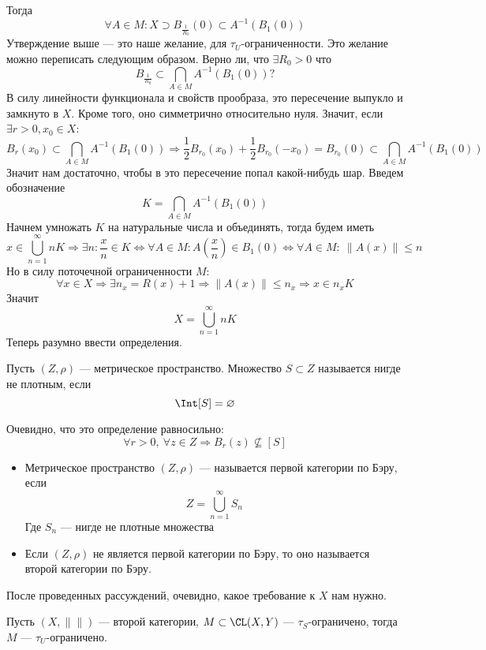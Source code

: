 Тогда 
$$
\forall A \in M: X \supset B_{\frac{1}{R_0}}(0) \subset A^{-1}(B_1(0))
$$
Утверждение выше --- это наше желание, для $\tau_U$-ограниченности. Это желание можно переписать следующим образом. Верно ли, что $\exists R_0 > 0$ что
$$
B_{\frac{1}{R_0}} \subset \bigcap_{A \in M}A^{-1}(B_1(0))?
$$
В силу линейности функционала и свойств прообраза, это пересечение выпукло и замкнуто в $X$. Кроме того, оно симметрично относительно нуля. Значит, если $\exists r > 0, x_0 \in X$:
$$
B_r(x_0) \subset \bigcap_{A \in M}A^{-1}(B_1(0)) \Rightarrow  \frac{1}{2}B_{r_0}(x_0) + \frac{1}{2}B_{r_0}(-x_0) = B_{r_0}(0)  \subset \bigcap_{A \in M}A^{-1}(B_1(0))
$$
Значит нам достаточно, чтобы в это пересечение попал какой-нибудь шар.
Введем обозначение
$$
K = \bigcap_{A \in M}A^{-1}(B_1(0))
$$ 
Начнем умножать $K$ на натуральные числа и объединять, тогда будем иметь
$$
x \in \bigcup_{n=1}^\infty nK \Rightarrow \exists n : \frac{x}{n} \in K \Leftrightarrow \forall A \in M:  A\left(\frac{x}{n}\right) \in B_1(0) \Leftrightarrow \forall A \in M : \ \|A(x)\| \leq n
$$
Но в силу поточечной ограниченности $M$: 
$$
\forall x \in X \Rightarrow \exists n_x = R(x) + 1 \Rightarrow \|A(x)\| \leq n_x \Rightarrow x \in n_x K
$$
Значит
$$
X = \bigcup_{n=1}^\infty nK
$$
Теперь разумно ввести определения. 
\begin{definition}
	Пусть $(Z, \rho)$ --- метрическое пространство. Множество $S \subset Z$ называется нигде не плотным, если 
	$$
	\Int [S] = \varnothing
	$$
\end{definition}
\begin{remark}
	Очевидно, что это определение равносильно:
	$$
	\forall r > 0, \ \forall z \in Z \Rightarrow B_r(z) \nsubseteq [S]
	$$
\end{remark}
\begin{definition}
	\hfill 
	\begin{itemize}
		\item Метрическое пространство $(Z, \rho)$ --- называется первой категории по Бэру, если 
		$$
		Z = \bigcup_{n=1}^\infty S_n
		$$
		Где $S_n$ --- нигде не плотные множества
		\item Если $(Z, \rho)$ не является первой категории по Бэру, то оно называется второй категории по Бэру.
	\end{itemize} 
\end{definition}
После проведенных рассуждений, очевидно, какое требование к $X$ нам нужно.
\begin{theorem}\label{th:banach-sht}
	Пусть $(X, \|\|)$ --- второй категории, $M \subset \CL(X,Y)$ --- $\tau_S$-ограничено, тогда $M$ --- $\tau_U$-ограничено.
\end{theorem}
